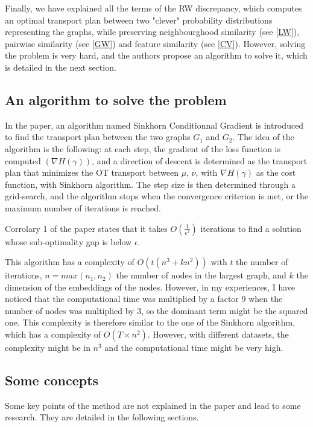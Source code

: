 \documentclass[a4paper,11pt]{article}
\begin{document}
Finally, we have explained all the terms of the RW discrepancy, which computes an optimal transport plan between two "clever" probability distributions representing the graphs, while preserving neighbourghood similarity (see \ref{LW}), pairwise similarity (see \ref{GW}) and feature similarity (see \ref{CV}).
However, solving the problem is very hard, and the authors propose an algorithm to solve it, which is detailed in the next section.


\subsection{An algorithm to solve the problem}

In the paper, an algorithm named Sinkhorn Conditionnal Gradient is introduced to find the transport plan between the two graphs $G_1$ and $G_2$. 
The idea of the algorithm is the following: at each step, the gradient of the loss function is computed $(\nabla H(\gamma))$, and a direction of descent is determined as the transport plan that minimizes the OT transport between $\mu$, $\nu$, with $\nabla H (\gamma)$ as the cost function, with Sinkhorn algorithm.
The step size is then determined through a grid-search, and the algorithm stops when the convergence criterion is met, or the maximum number of iterations is reached.

Corrolary 1 of the paper states that it takes $O(\frac{1}{\epsilon^2})$ iterations to find a solution whose sub-optimality gap is below $\epsilon$. 

This algorithm has a complexity of $O(t(n^3 + kn^2 ))$ with $t$ the number of iterations, $n = max(n_1, n_2)$ the number of nodes in the largest graph, and $k$ the dimension of the embeddings of the nodes. 
However, in my experiences, I have noticed that the computational time was multiplied by a factor 9 when the number of nodes was multiplied by 3, so the dominant term might be the squared one. 
This complexity is therefore similar to the one of the Sinkhorn algorithm, which has a complexity of $O(T \times n^2)$. 
However, with different datasets, the complexity might be in $n^3$ and the computational time might be very high.

\subsection{Some concepts}

Some key points of the method are not explained in the paper and lead to some research. 
They are detailed in the following sections.
\end{document}

